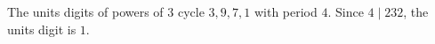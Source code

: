 The units digits of powers of $3$ cycle $3,9,7,1$ with period $4$. Since $4\mid232$, the units digit is $\boxed{1}$.
